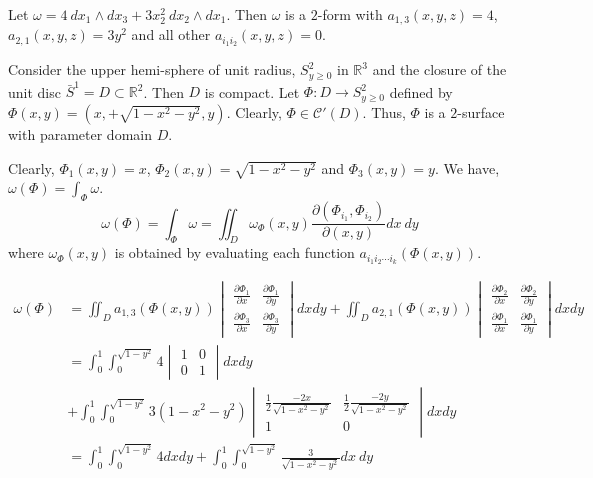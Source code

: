 \begin{commentary}
	Let $\omega = 4\ dx_1 \wedge dx_3 + 3x_2^2\ dx_2 \wedge dx_1$.
	Then $\omega$ is a $2$-form with $a_{1,3}(x,y,z) = 4$, $a_{2,1}(x,y,z) = 3y^2$ and all other $a_{i_1 i_2}(x,y,z) = 0$.

	Consider the upper hemi-sphere of unit radius, $S^2_{y \ge 0}$ in $\mathbb{R}^3$ and the closure of the unit disc $\bar{S}^1 = D \subset \mathbb{R}^2$.
	Then $D$ is compact.
	Let $\Phi : D \to S^2_{y \ge 0}$ defined by $\Phi(x,y) = (x,+\sqrt{1-x^2-y^2},y)$.
	Clearly, $\Phi \in \mathscr{C}'(D)$.
	Thus, $\Phi$ is a $2$-surface with parameter domain $D$.

	Clearly, $\Phi_1(x,y) = x$, $\Phi_2(x,y) = \sqrt{1-x^2-y^2}$ and $\Phi_3(x,y) = y$.
	We have, $\omega(\Phi) = \int_\Phi \omega$.
	\begin{equation}
		\omega(\Phi) = \int_\Phi \omega =  \iint_D \omega_\Phi(x,y) \frac{\partial ( \Phi_{i_1}, \Phi_{i_2})}{\partial ( x, y) } dx\ dy
	\end{equation}
	where $\omega_{\Phi}(x,y)$ is obtained by evaluating each function $a_{i_1i_2\cdots i_k}(\Phi(x,y))$.

	\begin{align*}
		\omega(\Phi) & = \iint_D a_{1,3}(\Phi(x,y)) \begin{vmatrix} \frac{\partial \Phi_1}{\partial x} & \frac{\partial \Phi_1}{\partial y} \\
		\frac{\partial \Phi_3}{\partial x} & \frac{\partial \Phi_3}{\partial y} \end{vmatrix} dx dy + \iint_D a_{2,1}(\Phi(x,y)) \begin{vmatrix} \frac{\partial \Phi_2}{\partial x} & \frac{\partial \Phi_2}{\partial y} \\
		\frac{\partial \Phi_1}{\partial x} & \frac{\partial \Phi_1}{\partial y} \end{vmatrix} dx dy \\
		& = \int_0^1 \int_0^{\sqrt{1-y^2}} 4 \begin{vmatrix} 1 & 0 \\ 0 & 1 \end{vmatrix} dx dy \\
		& + \int_0^1 \int_0^{\sqrt{1-y^2}} 3(1-x^2-y^2) \begin{vmatrix} \frac{1}{2}\frac{-2x}{\sqrt{1-x^2-y^2}} & \frac{1}{2} \frac{-2y}{\sqrt{1-x^2-y^2}} \\ 1 & 0 \end{vmatrix} dx dy \\
		& = \int_0^1 \int_0^{\sqrt{1-y^2}} 4 dx dy + \int_0^1 \int_0^{\sqrt{1-y^2}} \frac{3}{\sqrt{1-x^2-y^2}} dx\ dy
	\end{align*}
\end{commentary}

